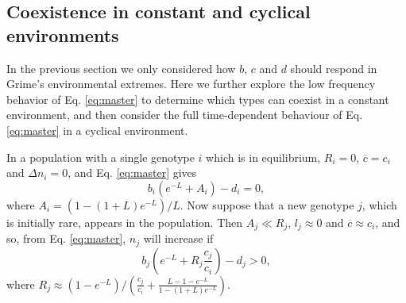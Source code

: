 \documentclass[11pt]{article}
\begin{document}
%

\subsection*{Coexistence in constant and cyclical environments}\label{sec:invas}

In the previous section we only considered how $b$, $c$ and $d$ should respond in Grime's environmental extremes. Here we further explore the low frequency behavior of Eq. \eqref{eq:master} to determine which types can coexist in a constant environment, and then consider the full time-dependent behaviour of Eq. \eqref{eq:master} in a cyclical environment. 

In a population with a single genotype $i$ which is in equilibrium, $R_i=0$, $\overline{c}=c_i$ and $\Delta n_i = 0$, and Eq. \eqref{eq:master} gives
\begin{equation}
b_i\left(e^{-L}+A_i\right)-d_i=0,\label{eq:equil}
\end{equation}
where $A_i=(1-(1+L)e^{-L})/L$. Now suppose that a new genotype $j$, which is initially rare, appears in the population. Then $A_j\ll R_j$, $l_j\approx 0$ and $\overline{c}\approx c_i$, and so, from Eq. \eqref{eq:master}, $n_j$ will increase if 
\begin{equation}
b_j \left(e^{-L}+R_j\frac{c_j}{c_i}\right)-d_j>0,\label{eq:invad}
\end{equation}
where $R_j\approx (1-e^{-L})/\left(\frac{c_j}{c_i}+\frac{L-1-e^{-L}}{1-(1+L)e^{-L}}\right)$. 
\end{document}
